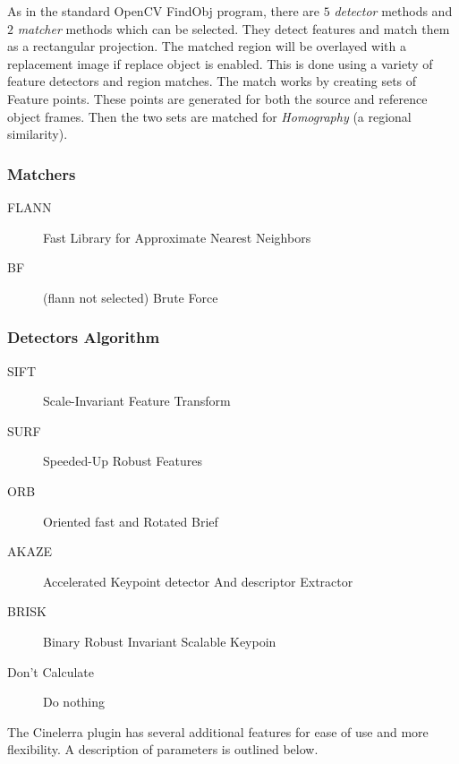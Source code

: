 As in the standard OpenCV FindObj program, there are $5$ \textit{detector} methods and $2$ \textit{matcher} methods which can be selected. They detect features and match them as a rectangular projection. The matched region will be overlayed with a replacement image if replace object is enabled. This is done using a variety of feature detectors and region matches. The match works by creating sets of Feature points. These points are generated for both the source and reference object frames. Then the two sets are matched for \textit{Homography} (a regional similarity).

\subsubsection*{Matchers}%
\label{ssub:matchers}

\begin{description}
    \item[FLANN] Fast Library for Approximate Nearest Neighbors
    \item[BF] (flann not selected) Brute Force
\end{description}

\subsubsection*{Detectors Algorithm}%
\label{ssub:detectors_algorithm}

\begin{description}
    \item[SIFT] Scale-Invariant Feature Transform
    \item[SURF] Speeded-Up Robust Features
    \item[ORB] Oriented fast and Rotated Brief
    \item[AKAZE] Accelerated Keypoint detector And descriptor Extractor
    \item[BRISK] Binary Robust Invariant Scalable Keypoin
    \item [Don’t Calculate] Do nothing
\end{description}

The Cinelerra plugin has several additional features for ease of use and more flexibility. A description of parameters is outlined below.

